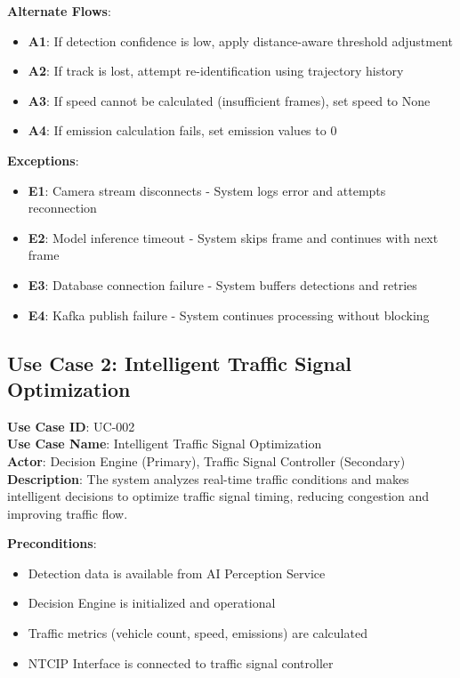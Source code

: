 \documentclass[12pt,a4paper]{article}
\begin{document}
\textbf{Alternate Flows}:
\begin{itemize}
    \item \textbf{A1}: If detection confidence is low, apply distance-aware threshold adjustment
    \item \textbf{A2}: If track is lost, attempt re-identification using trajectory history
    \item \textbf{A3}: If speed cannot be calculated (insufficient frames), set speed to None
    \item \textbf{A4}: If emission calculation fails, set emission values to 0
\end{itemize}

\textbf{Exceptions}:
\begin{itemize}
    \item \textbf{E1}: Camera stream disconnects - System logs error and attempts reconnection
    \item \textbf{E2}: Model inference timeout - System skips frame and continues with next frame
    \item \textbf{E3}: Database connection failure - System buffers detections and retries
    \item \textbf{E4}: Kafka publish failure - System continues processing without blocking
\end{itemize}

\subsection{Use Case 2: Intelligent Traffic Signal Optimization}

\textbf{Use Case ID}: UC-002 \\
\textbf{Use Case Name}: Intelligent Traffic Signal Optimization \\
\textbf{Actor}: Decision Engine (Primary), Traffic Signal Controller (Secondary) \\
\textbf{Description}: The system analyzes real-time traffic conditions and makes intelligent decisions to optimize traffic signal timing, reducing congestion and improving traffic flow.

\textbf{Preconditions}:
\begin{itemize}
    \item Detection data is available from AI Perception Service
    \item Decision Engine is initialized and operational
    \item Traffic metrics (vehicle count, speed, emissions) are calculated
    \item NTCIP Interface is connected to traffic signal controller
\end{itemize}
\end{document}
